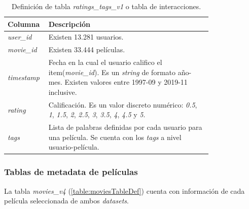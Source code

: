 \documentclass[11pt,a4paper,twoside]{thesis}
\begin{document}
\begin{table}[!htb]
	\centering
	\footnotesize
	\begin{tabular}{l | p{0.8\linewidth}}
	\hline
		Columna        & Descripción \\
	\hline

	\textit{user\_id}  & Existen 13.281 usuarios. \\
	\textit{movie\_id} & Existen 33.444 películas. \\
	\textit{timestamp} & Fecha en la cual el usuario califico el item(\textit{movie\_id}). Es un \textit{string} de formato año-mes. Existen valores entre 1997-09 y 2019-11 inclusive. \\
	\textit{rating}    & Calificación. Es un valor discreto numérico: \textit{0.5}, \textit{1}, \textit{1.5}, \textit{2}, \textit{2.5}, \textit{3}, \textit{3.5}, \textit{4}, \textit{4.5} y \textit{5}. \\
	\textit{tags}      & Lista de palabras definidas por cada usuario para una película. Se cuenta con los \textit{tags} a nivel usuario-película. \\
	\hline
	\end{tabular}
	\caption{
		Definición de tabla \textit{ratings\_tags\_v1} o tabla de interacciones.
	}
	\label{table:interactionsTableDef}
\end{table}

\subsubsection*{Tablas de metadata de películas}

La tabla \textit{movies\_v4} (\ref{table:moviesTableDef}) cuenta con información de cada película seleccionada de ambos \textit{datasets}. 
\end{document}
